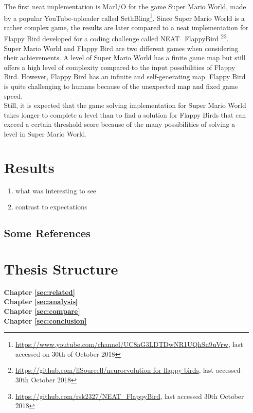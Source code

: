The first \gls{neat} implementation is MarI/O for the game Super Mario World, made by a popular YouTube-uploader called SethBling\footnote{\url{https://www.youtube.com/channel/UC8aG3LDTDwNR1UQhSn9uVrw}, last accessed on 30th of October 2018}. Since Super Mario World is a rather complex game, the results are later compared to a \gls{neat} implementation for Flappy Bird developed for a coding challenge called NEAT\_FlappyBird \footnote{\url{https://github.com/llSourcell/neuroevolution-for-flappy-birds}, last accessed 30th October 2018}\footnote{\url{https://github.com/rsk2327/NEAT_FlappyBird}, last accessed 30th October 2018}. \\
Super Mario World and Flappy Bird are two different games when considering their achievements. A level of Super Mario World has a finite game map but still offers a high level of complexity compared to the input possibilities of Flappy Bird. However, Flappy Bird has an infinite and self-generating map. Flappy Bird is quite challenging to humans because of the unexpected map and fixed game speed.\\ 
Still, it is expected that the game solving implementation for Super Mario World takes longer to complete a level than to find a solution for Flappy Birds that can exceed a certain threshold score because of the many possibilities of solving a level in Super Mario World.

\section{Results}
\label{sec:intro:results}
\begin{enumerate}
	\item what was interesting to see
	\item contrast to expectations
\end{enumerate}


\subsection{Some References}
\label{sec:intro:results:refs}

\section{Thesis Structure}
\label{sec:intro:structure}

\textbf{Chapter \ref{sec:related}} \\[0.2em]

\textbf{Chapter \ref{sec:analysis}} \\[0.2em]

\textbf{Chapter \ref{sec:compare}} \\[0.2em]

\textbf{Chapter \ref{sec:conclusion}} \\[0.2em]
